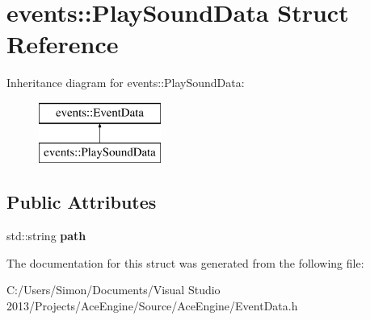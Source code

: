 \hypertarget{structevents_1_1_play_sound_data}{}\section{events\+:\+:Play\+Sound\+Data Struct Reference}
\label{structevents_1_1_play_sound_data}
Inheritance diagram for events\+:\+:Play\+Sound\+Data\+:\begin{figure}[H]
\begin{center}
\leavevmode
\includegraphics[height=2.000000cm]{structevents_1_1_play_sound_data}
\end{center}
\end{figure}
\subsection*{Public Attributes}
\begin{DoxyCompactItemize}
\item 
\hypertarget{structevents_1_1_play_sound_data_a3d40888a5a2d96d97e276148289ff49e}{}std\+::string {\bfseries path}\label{structevents_1_1_play_sound_data_a3d40888a5a2d96d97e276148289ff49e}

\end{DoxyCompactItemize}


The documentation for this struct was generated from the following file\+:\begin{DoxyCompactItemize}
\item 
C\+:/\+Users/\+Simon/\+Documents/\+Visual Studio 2013/\+Projects/\+Ace\+Engine/\+Source/\+Ace\+Engine/Event\+Data.\+h\end{DoxyCompactItemize}
